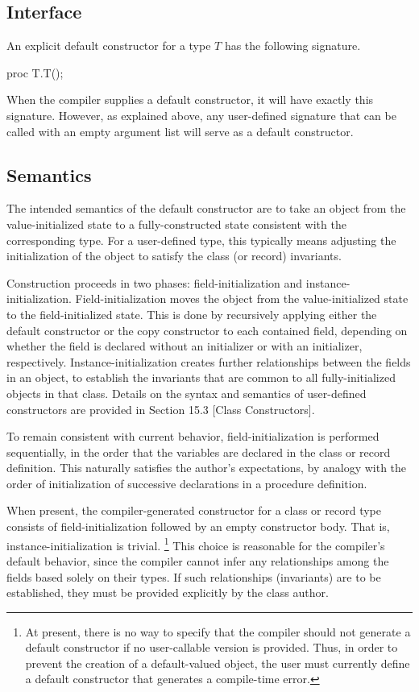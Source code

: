 \subsection{Interface}

An explicit default constructor for a type $T$ has the following signature.
\begin{chapel}
proc T.T();
\end{chapel}
When the compiler supplies a default constructor, it will have exactly this
signature.  However, as explained above, any user-defined signature that can be
called with an empty argument list will serve as a default constructor.

\subsection{Semantics}

The intended semantics of the default constructor are to take an object from the
value-initialized state to a fully-constructed state consistent with the
corresponding type.  For a user-defined type, this typically means adjusting the
initialization of the object to satisfy the class (or record) invariants.

Construction proceeds in two phases: field-initialization and
instance-initialization.  Field-initialization moves the object from the
value-initialized state to the field-initialized state.  This is done by
recursively applying either the default constructor or the copy constructor to
each contained field, depending on whether the field is declared without an
initializer or with an initializer, respectively.  Instance-initialization
creates further relationships between the fields in an object, to establish the
invariants that are common to all fully-initialized objects in that class.
Details on the syntax and semantics of user-defined constructors are provided in
Section 15.3 [Class Constructors].

To remain consistent with current behavior, field-initialization is performed
sequentially, in the order that the variables are declared in the class or
record definition.  This naturally satisfies the author's expectations, by
analogy with the order of initialization of successive declarations 
in a procedure definition.

When present, the compiler-generated constructor for a class or record type
consists of field-initialization followed by an empty constructor body.  That
is, instance-initialization is trivial.
\footnote{At present, there is no way to specify that the compiler should not generate a
default constructor if no user-callable version is provided.  Thus, in order to
prevent the creation of a default-valued object, the user must currently define
a default constructor that generates a compile-time error.}
This choice is reasonable for the
compiler's default behavior, since the compiler cannot infer any relationships
among the fields based solely on their types.  If such relationships
(invariants) are to be established, they must be provided explicitly by the
class author.

